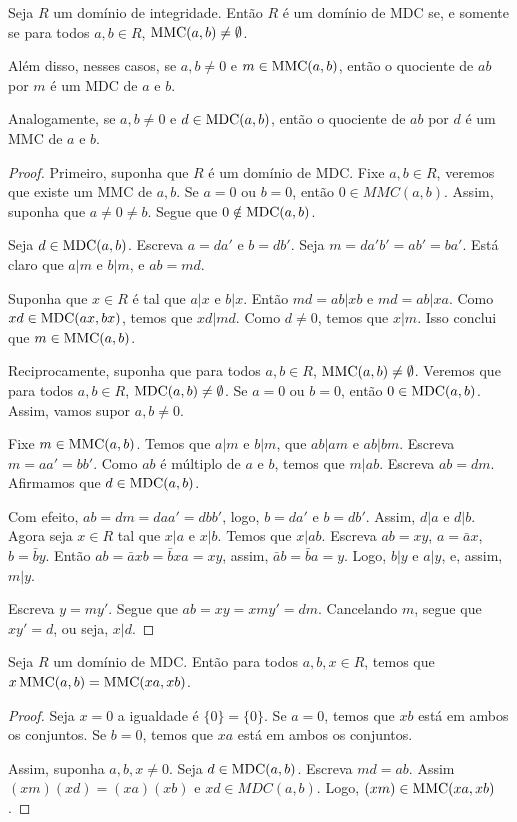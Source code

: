 \begin{prop}
    Seja $R$ um domínio de integridade.
    Então $R$ é um domínio de MDC se, e somente se para todos $a, b \in R$, $\operatorname{MMC}(a, b)\neq \emptyset$.

    Além disso, nesses casos, se $a, b \neq 0$ e $m\in \operatorname{MMC}(a, b)$, então o quociente de $ab$ por $m$ é um MDC de $a$ e $b$.

    Analogamente, se $a, b \neq 0$ e $d\in \operatorname{MDC}(a, b)$, então o quociente de $ab$ por $d$ é um MMC de $a$ e $b$.
\end{prop}

\begin{proof}
    Primeiro, suponha que $R$ é um domínio de MDC.
    Fixe $a, b \in R$,
    veremos que existe um MMC de $a, b$.
    Se $a=0$ ou $b=0$, então $0 \in MMC(a, b)$.
    Assim, suponha que $a\neq 0\neq b$.
    Segue que $0 \notin \operatorname{MDC}(a, b)$.

    Seja $d \in \operatorname{MDC}(a, b)$.
    Escreva $a=da'$ e $b=db'$.
    Seja $m=da'b'=ab'=ba'$.
    Está claro que $a|m$ e $b|m$, e $ab=md$.

    Suponha que $x\in R$ é tal que $a|x$ e $b|x$.
    Então $md=ab|xb$ e $md=ab|xa$.
    Como $xd\in \operatorname{MDC}(ax, bx)$, temos que $xd|md$.
    Como $d\neq 0$, temos que $x|m$.
    Isso conclui que $m \in \operatorname{MMC}(a, b)$.

    Reciprocamente, suponha que para todos $a, b \in R$, $\operatorname{MMC}(a, b)\neq \emptyset$. Veremos que para todos $a, b \in R$, $\operatorname{MDC}(a, b)\neq \emptyset$.
    Se $a=0$ ou $b=0$, então $0 \in \operatorname{MDC}(a, b)$.
    Assim, vamos supor $a, b \neq 0$.

    Fixe $m \in \operatorname{MMC}(a, b)$.
    Temos que $a|m$ e $b|m$, que $ab|am$ e $ab|bm$.
    Escreva $m=aa'=bb'$.
    Como $ab$ é múltiplo de $a$ e $b$, temos que $m|ab$.
    Escreva $ab=dm$.
    Afirmamos que $d \in \operatorname{MDC}(a, b)$.
    
    Com efeito, $ab=dm=daa'=dbb'$, logo, $b=da'$ e $b=db'$.
    Assim, $d|a$ e $d|b$.
    Agora seja $x\in R$ tal que $x|a$ e $x|b$.
    Temos que $x|ab$.
    Escreva $ab=xy$, $a=\bar ax$, $b=\bar by$.
    Então $ab=\bar axb=\bar bxa=xy$, assim, $\bar ab=\bar ba=y$.
    Logo, $b|y$ e $a|y$, e, assim, $m|y$.

    Escreva $y=my'$.
    Segue que $ab=xy=xmy'=dm$.
    Cancelando $m$, segue que $xy'=d$, ou seja, $x|d$.
\end{proof}

\begin{corol}
    Seja $R$ um domínio de MDC.
    Então para todos $a, b, x \in R$, temos que $x\operatorname{MMC}(a, b)=\operatorname{MMC}(xa, xb)$.
\end{corol}
\begin{proof}
Seja $x=0$ a igualdade é $\{0\}=\{0\}$.
Se $a=0$, temos que $xb$ está em ambos os conjuntos.
Se $b=0$, temos que $xa$ está em ambos os conjuntos.

Assim, suponha $a, b, x \neq 0$.
Seja $d\in \operatorname{MDC}(a, b)$.
Escreva $md=ab$.
Assim $(xm)(xd)=(xa)(xb)$ e $xd \in MDC(a, b)$.
Logo, $(xm)\in \operatorname{MMC}(xa, xb)$.
\end{proof}

